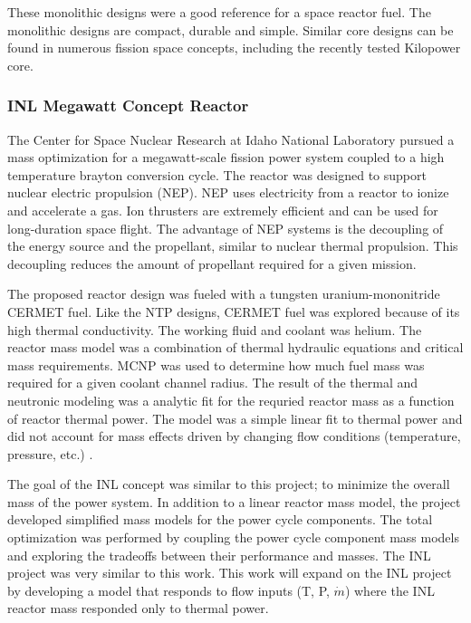     These monolithic designs were a good reference for a space reactor fuel.
    The monolithic designs are compact, durable and simple. Similar core designs
    can be found in numerous fission space concepts, including the recently
    tested Kilopower core.

    \subsubsection{INL Megawatt Concept Reactor}
    The Center for Space Nuclear Research at Idaho National Laboratory pursued a
    mass optimization for a megawatt-scale fission power system coupled to a
    high temperature brayton conversion cycle. The reactor was designed to
    support nuclear electric propulsion (NEP). NEP uses electricity from a
    reactor to ionize and accelerate a gas. Ion thrusters are extremely
    efficient and can be used for long-duration space flight. The advantage of
    NEP systems is the decoupling of the energy source and the propellant,
    similar to nuclear thermal propulsion. This decoupling reduces the amount of
    propellant required for a given mission.
    
    The proposed reactor design was fueled with a tungsten uranium-mononitride
    CERMET fuel. Like the NTP designs, CERMET fuel was explored because of its
    high thermal conductivity. The working fluid and coolant was helium. The
    reactor mass model was a combination of thermal hydraulic equations and
    critical mass requirements. MCNP was used to determine how much fuel mass
    was required for a given coolant channel radius. The result of the thermal
    and neutronic modeling was a analytic fit for the requried reactor mass as a
    function of reactor thermal power. The model was a simple linear fit to
    thermal power and did not account for mass effects driven by changing flow
    conditions (temperature, pressure, etc.) \citep{webb_combined_2011}. 
    
    The goal of the INL concept was similar to this project; to minimize the overall mass of the
    power system. In addition to a linear reactor mass model, the project
    developed simplified mass models for the power cycle components.
    The total optimization was performed by coupling the power cycle
    component mass models and exploring the tradeoffs between their performance
    and masses. The INL project was very similar to this work. This work will
    expand on the INL project by developing a model that responds to flow inputs
    (T, P, $\dot{m}$) where the INL reactor mass responded only to thermal
    power.

